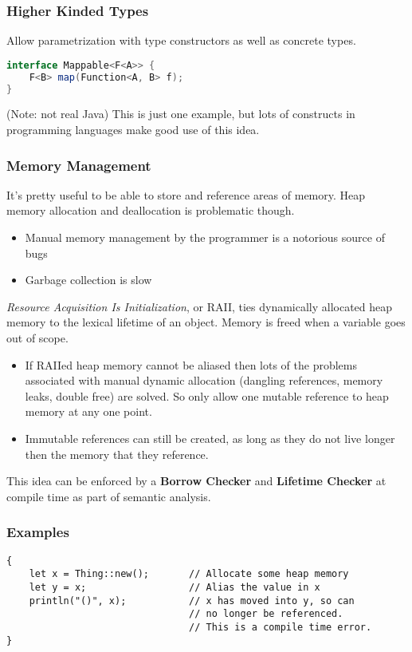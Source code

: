 \documentclass[xcolor=dvipsnames, aspectratio=169]{beamer}
\begin{document}
\begin{frame}[fragile]
    \frametitle{Higher Kinded Types}
    Allow parametrization with type constructors as well as concrete types.
    \begin{lstlisting}[language=Java, basicstyle=\footnotesize\ttfamily]
interface Mappable<F<A>> {
    F<B> map(Function<A, B> f);
}
    \end{lstlisting}
    (Note: not real Java)
    This is just one example, but lots of constructs in programming languages
    make good use of this idea.
\end{frame}

\begin{frame}
    \frametitle{Memory Management}
    It's pretty useful to be able to store and reference areas of memory.  Heap
    memory allocation and deallocation is problematic though.
    \begin{itemize}
        \item Manual memory management by the programmer is a notorious source
            of bugs
        \item Garbage collection is slow
    \end{itemize}
\end{frame}

\begin{frame}
    \textit{Resource Acquisition Is Initialization}, or RAII, ties dynamically
    allocated heap memory to the lexical lifetime of an object. Memory is freed
    when a variable goes out of scope.
    \begin{itemize}
        \item If RAIIed heap memory cannot be aliased then lots of the problems
            associated with manual dynamic allocation (dangling references,
            memory leaks, double free) are solved. So only allow one mutable
            reference to heap memory at any one point.
        \item Immutable references can still be created, as long as they do
            not live longer then the memory that they reference.
    \end{itemize}
\end{frame}

\begin{frame}[fragile]
    This idea can be enforced by a \textbf{Borrow Checker} and
    \textbf{Lifetime Checker} at compile time as part of semantic analysis.
\end{frame}

\begin{frame}[fragile]
    \frametitle{Examples}
    \begin{lstlisting}[basicstyle=\footnotesize\ttfamily]
{
    let x = Thing::new();       // Allocate some heap memory
    let y = x;                  // Alias the value in x
    println("()", x);           // x has moved into y, so can 
                                // no longer be referenced.
                                // This is a compile time error.
}
    \end{lstlisting}
\end{frame}
\end{document}
